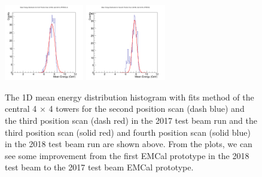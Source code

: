 \documentclass[hidelinks,11pt]{article}
\numberwithin{figure}{section}
\numberwithin{table}{section}
\begin{document}
\begin{figure}[hbtp]
\begin{center}
\includegraphics[width=0.31\textwidth]{Plots/CentralProj/20186thRMSPlotGausFitted.png}
\includegraphics[width=0.31\textwidth]{Plots/CentralProj/20187thRMSPlotGausFitted.png}
\caption{The 1D mean energy distribution histogram with fits method of the central 4 $\times$ 4 towers for the second position scan (dash blue) and the third position scan (dash red) in the 2017 test beam run and the third position scan (solid red) and fourth position scan (solid blue) in the 2018 test beam run are shown above. From the plots, we can see some improvement from the first EMCal prototype in the 2018 test beam to the 2017 test beam EMCal prototype.}
\label{fig:RMS}
\end{center}
\end{figure} 
\end{document}
